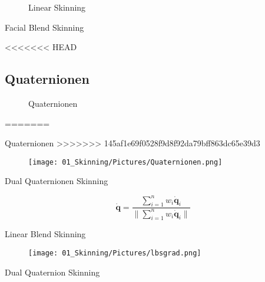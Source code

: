 \begin{frame}{
			\begin{figure}
				\colorbox{black!10}{\Huge{Linear Skinning}}
			\end{figure}
		}
\begin{frame}{\Huge{Facial Blend Skinning}}
					
					
				\end{frame}
<<<<<<< HEAD
\subsection{Quaternionen}
				\begin{frame}{
						\begin{figure}
							\colorbox{black!10}{\Huge{Quaternionen}}
						\end{figure}
					}
=======

				\begin{frame}{\Huge{Quaternionen}}
>>>>>>> 145af1e69f0528f9d8f92da79bff863dc65e39d3
					
					\begin{figure}
						\texttt{[image: 01\_Skinning/Pictures/Quaternionen.png]}
					\end{figure}
					
					
					
				\end{frame}
				
		\begin{frame}{\Huge{Dual Quaternionen Skinning}}
			
			$$\mathbf{\dot q} =  \frac{\sum_{i=1}^n w_i \mathbf{\dot q}_i}{\| \sum_{i=1}^n w_i \mathbf{\dot q}_i \|}$$
			
			
		\end{frame}
		
				\begin{frame}{\Huge{Linear Blend Skinning}}
					
					\begin{figure}
						\texttt{[image: 01\_Skinning/Pictures/lbsgrad.png]}
					\end{figure}
					
					
					
				\end{frame}
				
						\begin{frame}{\Huge{Dual Quaternion Skinning}}
							

\end{frame}
\end{frame}
\end{frame}
